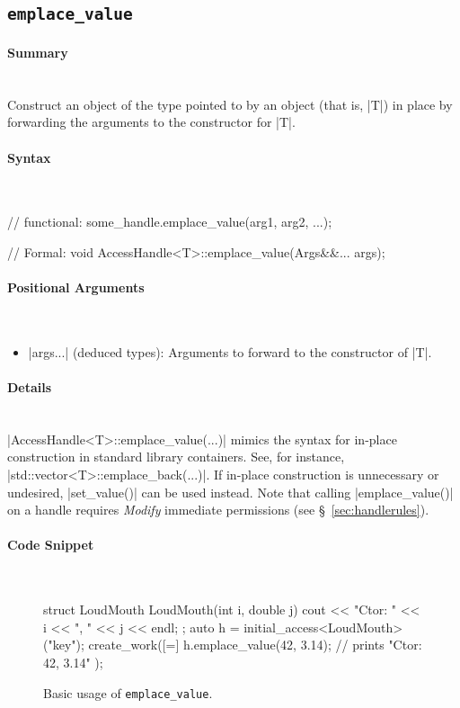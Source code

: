 \subsection{\texttt{emplace\_value}}
\label{ssec:api_fe_emplace_value}

\paragraph{Summary}\mbox{}\\ 
Construct an object of the type pointed to by an \ahandleT object
(that is, |T|) in place by forwarding the arguments to the constructor
for |T|.

\paragraph{Syntax}\mbox{}\\ 
\begin{CppCode}
// functional:
some_handle.emplace_value(arg1, arg2, ...);

// Formal:
void AccessHandle<T>::emplace_value(Args&&... args);
\end{CppCode}

\paragraph{Positional Arguments}\mbox{}\\ 
\begin{itemize}
  \item |args...| (deduced types):  Arguments to forward to the
  constructor of |T|.
\end{itemize}

\paragraph{Details}\mbox{}\\ 

|AccessHandle<T>::emplace_value(...)| mimics the syntax for in-place
construction in standard library containers.  See, for instance,
|std::vector<T>::emplace_back(...)|.  If in-place construction is
unnecessary or undesired, |set_value()| can be used instead.  
Note that
calling |emplace_value()| on a handle requires {\it Modify} immediate
permissions (see \S~\ref{sec:handlerules}).

\paragraph{Code Snippet}\mbox{}\\ 
\begin{figure}[!h]
\begin{CppCodeNumb}
struct LoudMouth {
  LoudMouth(int i, double j) { cout << "Ctor: " << i << ", " << j << endl; }
};
auto h = initial_access<LoudMouth>("key");
create_work([=]{
  h.emplace_value(42, 3.14); // prints "Ctor: 42, 3.14" 
});
\end{CppCodeNumb}
\label{fig:fe_api_initialaccess}
\caption{Basic usage of \lstinline|emplace_value|.}
\end{figure}

